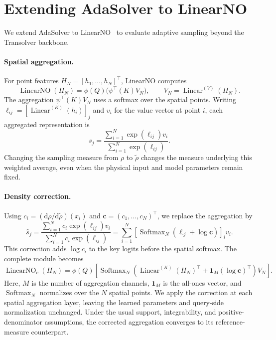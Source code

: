 \section{Extending AdaSolver to LinearNO}
\label{app:linearno_extension}

We extend AdaSolver to LinearNO~\citep{hu2026transolverlinear} to evaluate
adaptive sampling beyond the Transolver backbone.

\paragraph{Spatial aggregation.}
For point features $H_N=[h_1,\ldots,h_N]^\top$, LinearNO computes
\begin{equation}
    \operatorname{LinearNO}(H_N)
    =\phi(Q)\bigl(\psi^\top(K)V_N\bigr),
    \qquad V_N=\operatorname{Linear}^{(V)}(H_N).
    \label{eq:linearno_original}
\end{equation}
The aggregation $\psi^\top(K)V_N$ uses a softmax over the spatial points.
Writing $\ell_{ij}=[\operatorname{Linear}^{(K)}(h_i)]_j$ and $v_i$ for the
value vector at point $i$, each aggregated representation is
\begin{equation}
    s_j=\frac{\sum_{i=1}^{N}\exp(\ell_{ij})v_i}
             {\sum_{i=1}^{N}\exp(\ell_{ij})}.
    \label{eq:linearno_aggregation}
\end{equation}
Changing the sampling measure from $\rho$ to $\widetilde\rho$ changes the
measure underlying this weighted average, even when the physical input
and model parameters remain fixed.

\paragraph{Density correction.}
Using $c_i=(\mathrm{d}\rho/\mathrm{d}\widetilde\rho)(x_i)$ and
$\mathbf c=(c_1,\ldots,c_N)^\top$, we replace the aggregation by
\begin{equation}
    \widehat s_j
    =\frac{\sum_{i=1}^{N}c_i\exp(\ell_{ij})v_i}
           {\sum_{i=1}^{N}c_i\exp(\ell_{ij})}
    =\sum_{i=1}^{N}\left[
        \operatorname{Softmax}_{N}(\ell_{\cdot j}+\log\mathbf c)
      \right]_i v_i.
    \label{eq:linearno_corrected_aggregation}
\end{equation}
This correction adds $\log c_i$ to the key logits before the spatial
softmax. The complete module becomes
\begin{equation}
    \boxed{
    \operatorname{LinearNO}_{c}(H_N)
    =\phi(Q)\!\left[
      \operatorname{Softmax}_{N}\!\left(
        \operatorname{Linear}^{(K)}(H_N)^\top
        +\mathbf 1_M(\log\mathbf c)^\top
      \right)V_N
    \right].}
    \label{eq:linearno_corrected_module}
\end{equation}
Here, $M$ is the number of aggregation channels, $\mathbf 1_M$ is the
all-ones vector, and $\operatorname{Softmax}_{N}$ normalizes over the $N$
spatial points. We apply the correction at each spatial aggregation layer,
leaving the learned parameters and query-side normalization unchanged.
Under the usual support, integrability, and positive-denominator assumptions,
the corrected aggregation converges to its reference-measure counterpart.

